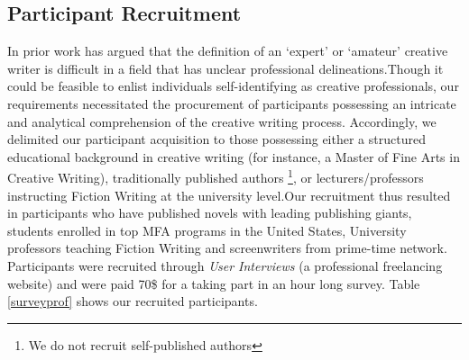 \subsection{Participant Recruitment}
In prior work \cite{gero2023social} has argued that the definition of an ‘expert’ or ‘amateur’ creative writer is difficult in a field that has unclear professional delineations.Though it could be feasible to enlist individuals self-identifying as creative professionals, our requirements necessitated the procurement of participants possessing an intricate and analytical comprehension of the creative writing process. Accordingly, we delimited our participant acquisition to those possessing either a structured educational background in creative writing (for instance, a Master of Fine Arts in Creative Writing), traditionally published authors \footnote{We do not recruit self-published authors}, or lecturers/professors instructing Fiction Writing at the university level.Our recruitment thus resulted in participants who have published novels with leading publishing giants, students enrolled in top MFA programs in the United States, University professors teaching Fiction Writing and screenwriters from prime-time network. Participants were recruited through \textit{User Interviews} (a professional freelancing website) and were paid 70\$ for a taking part in an hour long survey. Table \ref{surveyprof} shows our recruited participants.

